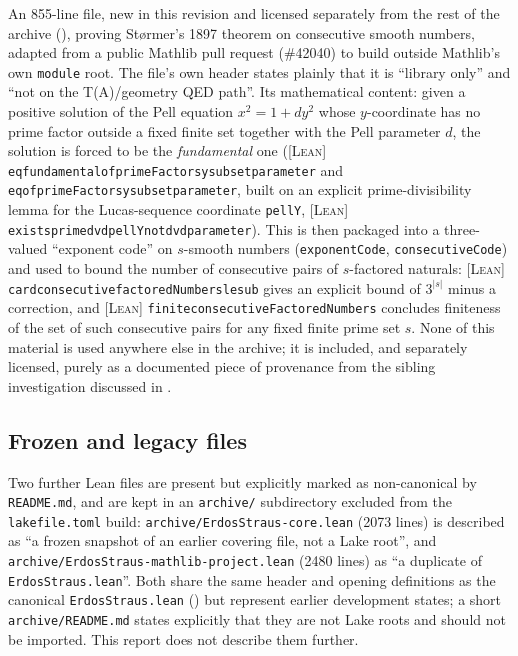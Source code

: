 \documentclass[11pt]{article}
\theoremstyle{plain}
\theoremstyle{definition}
\theoremstyle{remark}
\newcommand{\LEAN}{\textcolor{proved}{\textsc{[Lean]}}}
\newcommand{\file}[1]{\texttt{#1}}
\newcommand{\lean}[1]{\texttt{#1}}
\renewcommand{\_}{\textunderscore\allowbreak}
\begin{document}
An 855-line file, new in this revision and licensed separately from the rest of the archive
(), proving St\o rmer's 1897 theorem \cite{Stormer1897} on consecutive smooth numbers,
adapted from a public Mathlib pull request (\#42040) to build outside Mathlib's own
\texttt{module} root. The file's own header states plainly that it is ``library only'' and
``not on the T(A)/geometry QED path''. Its mathematical content: given a positive solution of
the Pell equation $x^2=1+dy^2$ whose $y$-coordinate has no prime factor outside a fixed finite
set together with the Pell parameter $d$, the solution is forced to be the \emph{fundamental}
one (\LEAN{} \lean{eq\_fundamental\_of\_primeFactors\_y\_subset\_parameter} and
\lean{eq\_of\_primeFactors\_y\_subset\_parameter}, built on an explicit prime-divisibility lemma
for the Lucas-sequence coordinate \lean{pellY}, \LEAN{}
\lean{exists\_prime\_dvd\_pellY\_not\_dvd\_parameter}). This is then packaged into a
three-valued ``exponent code'' on $s$-smooth numbers (\lean{exponentCode},
\lean{consecutiveCode}) and used to bound the number of consecutive pairs of $s$-factored
naturals: \LEAN{} \lean{card\_consecutive\_factoredNumbers\_le\_sub} gives an explicit bound of
$3^{|s|}$ minus a correction, and \LEAN{} \lean{finite\_consecutiveFactoredNumbers} concludes
finiteness of the set of such consecutive pairs for any fixed finite prime set $s$. None of this
material is used anywhere else in the archive; it is included, and separately licensed, purely
as a documented piece of provenance from the sibling investigation discussed in .

\subsection{Frozen and legacy files}
\label{subsec:legacy}

Two further Lean files are present but explicitly marked as non-canonical by \file{README.md},
and are kept in an \file{archive/} subdirectory excluded from the \file{lakefile.toml} build:
\texttt{archive/\allowbreak ErdosStraus-\allowbreak core.lean} (2073 lines) is described as ``a frozen snapshot of an earlier
covering file, not a Lake root'', and \texttt{archive/\allowbreak ErdosStraus-\allowbreak mathlib-\allowbreak project.lean} (2480 lines) as
``a duplicate of \file{ErdosStraus.lean}''. Both share the same header and opening definitions
as the canonical \file{ErdosStraus.lean} () but represent earlier
development states; a short \texttt{archive/README.md} states explicitly that they are not Lake
roots and should not be imported. This report does not describe them further.
\end{document}
